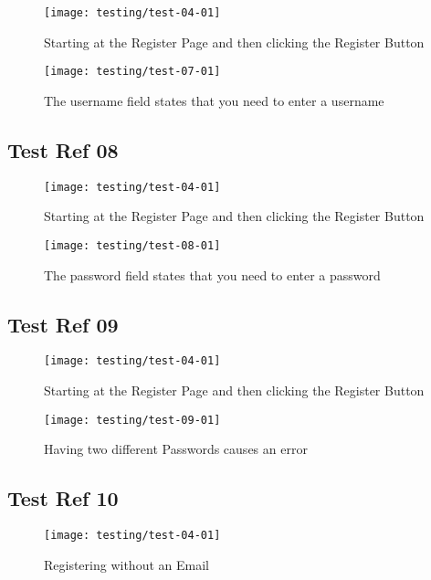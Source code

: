 \begin{figure}[H]
\centering
\texttt{[image: testing/test-04-01]}
\caption{Starting at the Register Page and then clicking the Register Button}
\label{test-07-01}
\end{figure}

\begin{figure}[H]
\centering
\texttt{[image: testing/test-07-01]}
\caption{The username field states that you need to enter a username}
\label{test-07-02}
\end{figure}

\subsection{Test Ref 08}

\begin{figure}[H]
\centering
\texttt{[image: testing/test-04-01]}
\caption{Starting at the Register Page and then clicking the Register Button}
\label{test-08-01}
\end{figure}

\begin{figure}[H]
\centering
\texttt{[image: testing/test-08-01]}
\caption{The password field states that you need to enter a password}
\label{test-08-02}
\end{figure}

\subsection{Test Ref 09}

\begin{figure}[H]
\centering
\texttt{[image: testing/test-04-01]}
\caption{Starting at the Register Page and then clicking the Register Button}
\label{test-09-01}
\end{figure}

\begin{figure}[H]
\centering
\texttt{[image: testing/test-09-01]}
\caption{Having two different Passwords causes an error}
\label{test-09-02}
\end{figure}

\subsection{Test Ref 10}

\begin{figure}[H]
\centering
\texttt{[image: testing/test-04-01]}
\caption{Registering without an Email}
\label{test-09-01}
\end{figure}

